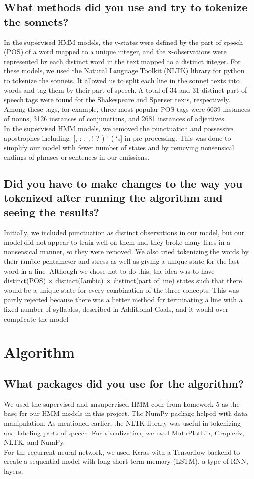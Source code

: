 \subsection{What methods did you use and try to tokenize the sonnets?}
In the supervised HMM models, the y-states were defined by the part of speech (POS) of a word mapped to a unique integer, and the x-observations were represented by each distinct word in the text mapped to a distinct integer. For these models, we used the Natural Language Toolkit (NLTK) library for python to tokenize the sonnets. It allowed us to split each line in the sonnet texts into words and tag them by their part of speech. A total of 34 and 31 distinct part of speech tags were found for the Shakespeare and Spenser texts, respectively. Among these tags, for example, three most popular POS tags were 6039 instances of nouns, 3126 instances of conjunctions, and 2681 instances of adjectives.\\
\indent In the supervised HMM models, we removed the punctuation and possessive apostrophes including: [, : . ; ! ? ) ' ( `s] in pre-processing. This was done to simplify our model with fewer number of states and by removing nonsensical endings of phrases or sentences in our emissions.
\subsection{Did you have to make changes to the way you tokenized after running the algorithm and seeing the results?}
Initially, we included punctuation as distinct observations in our model, but our model did not appear to train well on them and they broke many lines in a nonsensical manner, so they were removed. We also tried tokenizing the words  by their iambic pentameter and stress as well as giving a unique state for the last word in a line. Although we chose not to do this, the idea was to have distinct(POS) $\times$ distinct(Iambic) $\times$ distinct(part of line) states such that there would be a unique state for every combination of the three concepts. This was partly rejected because there was a better method for terminating a line with a fixed number of syllables, described in Additional Goals, and it would over-complicate the model.

\section{Algorithm}
\medskip
\subsection{What packages did you use for the algorithm?}
We used the supervised and unsupervised HMM code from homework 5 as the base for our HMM models in this project. The NumPy package helped with data manipulation. As mentioned earlier, the NLTK library was useful in tokenizing and labeling parts of speech. For visualization, we used MathPlotLib, Graphviz, NLTK, and NumPy. \\
\indent For the recurrent neural network, we used Keras with a Tensorflow backend to create a sequential model with long short-term memory (LSTM), a type of RNN, layers.
